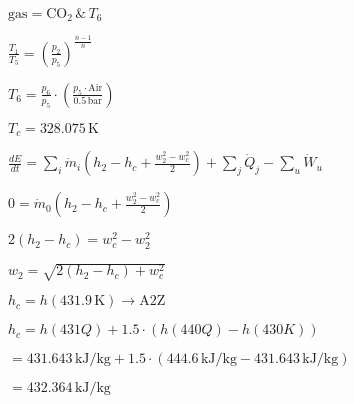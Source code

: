 \( \text{gas} = \text{CO}_2 \, \& \, T_6 \)  

\( \frac{T_1}{T_5} = \left( \frac{p_2}{p_5} \right)^{\frac{n-1}{n}} \)  

\( T_6 = \frac{p_6}{p_5} \cdot \left( \frac{p_5 \cdot \text{Air}}{0.5 \, \text{bar}} \right) \)  

\( T_c = 328.075 \, \text{K} \)  

\( \frac{dE}{dt} = \sum_i \dot{m}_i \left( h_2 - h_c + \frac{w_2^2 - w_c^2}{2} \right) + \sum_j \dot{Q}_j - \sum_u \dot{W}_u \)  

\( 0 = \dot{m}_0 \left( h_2 - h_c + \frac{w_2^2 - w_c^2}{2} \right) \)  

\( 2 \left( h_2 - h_c \right) = w_c^2 - w_2^2 \)  

\( w_2 = \sqrt{2 \left( h_2 - h_c \right) + w_c^2} \)  

\( h_c = h \left( 431.9 \, \text{K} \right) \to \text{A2Z} \)  

\( h_c = h \left( 431Q \right) + 1.5 \cdot \left( h \left( 440Q \right) - h \left( 430K \right) \right) \)  

\( = 431.643 \, \text{kJ/kg} + 1.5 \cdot \left( 444.6 \, \text{kJ/kg} - 431.643 \, \text{kJ/kg} \right) \)  

\( = 432.364 \, \text{kJ/kg} \)